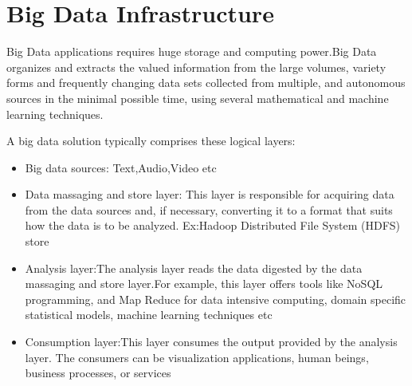 \documentclass[sigconf]{acmart}
\begin{document}
\section{Big Data Infrastructure}
Big Data applications requires huge storage and computing power.Big Data organizes and extracts the valued information from the large volumes, variety forms and frequently changing data sets collected from multiple, and autonomous sources 
in the minimal possible time, using several mathematical and machine learning techniques.

A big data solution typically comprises these logical layers:
 \begin{itemize}
    \item Big data sources: Text,Audio,Video etc
    \item Data massaging and store layer: This layer is responsible for acquiring data from the data sources and, if necessary, converting it to a format that suits how the data is to be analyzed. 
    Ex:Hadoop Distributed File System (HDFS) store
    \item Analysis layer:The analysis layer reads the data digested by the data massaging and store layer.For example, this layer offers tools like NoSQL programming, and Map Reduce for data intensive computing, domain specific statistical models, machine learning techniques etc
    \item Consumption layer:This layer consumes the output provided by the analysis layer. The consumers can be visualization applications, human beings, business processes, or services
 \end{itemize}
 
\end{document}
